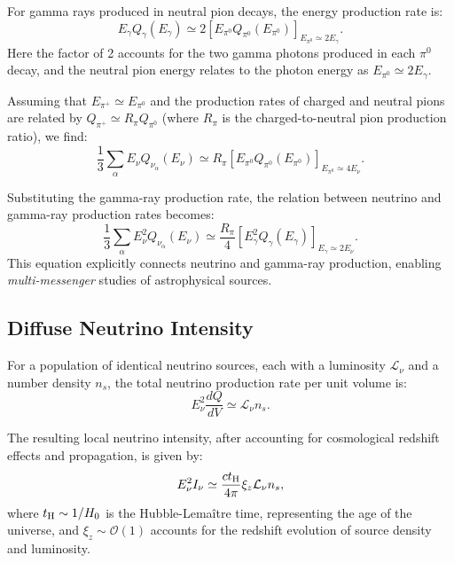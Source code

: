 For gamma rays produced in neutral pion decays, the energy production rate is:  
\begin{equation}
E_\gamma Q_\gamma(E_\gamma) \simeq 2 \left[ E_{\pi^0} Q_{\pi^0}(E_{\pi^0}) \right]_{E_{\pi^0} \simeq 2 E_\gamma}.
\end{equation}
Here the factor of 2 accounts for the two gamma photons produced in each \(\pi^0\) decay,  and the neutral pion energy relates to the photon energy as \(E_{\pi^0} \simeq 2 E_\gamma\).  

Assuming that \(E_{\pi^+} \simeq E_{\pi^0}\) and the production rates of charged and neutral pions are related by \(Q_{\pi^+} \simeq R_\pi Q_{\pi^0}\) (where \(R_\pi\) is the charged-to-neutral pion production ratio), we find:  
\begin{equation}
\frac{1}{3} \sum_\alpha E_\nu Q_{\nu_\alpha}(E_\nu) \simeq R_\pi \left[ E_{\pi^0} Q_{\pi^0}(E_{\pi^0}) \right]_{E_{\pi^0} \simeq 4 E_\nu}.
\end{equation}

Substituting the gamma-ray production rate, the relation between neutrino and gamma-ray production rates becomes:
\begin{equation}
\frac{1}{3} \sum_\alpha E_\nu^2 Q_{\nu_\alpha}(E_\nu) \simeq \frac{R_\pi}{4} \left[ E_\gamma^2 Q_\gamma(E_\gamma) \right]_{E_\gamma \simeq 2 E_\nu}.
\end{equation}
%
This equation explicitly connects neutrino and gamma-ray production, enabling \emph{multi-messenger} studies of astrophysical sources.  

\subsection{Diffuse Neutrino Intensity}

For a population of identical neutrino sources, each with a luminosity \(\mathcal{L}_\nu\) and a number density \(n_s\), the total neutrino production rate per unit volume is:  
\begin{equation}
E_\nu^2 \frac{dQ}{dV} \simeq \mathcal{L}_\nu n_s.
\end{equation}

The resulting local neutrino intensity, after accounting for cosmological redshift effects and propagation, is given by:
\begin{equation}
E_\nu^2 I_\nu \simeq \frac{c t_{\rm H}}{4\pi} \xi_z \mathcal{L}_\nu n_s,
\end{equation}
where \(t_{\rm H} \sim 1/H_0\) is the Hubble-Lemaître time, representing the age of the universe, and \(\xi_z \sim \mathcal{O}(1)\) accounts for the redshift evolution of source density and luminosity. 

